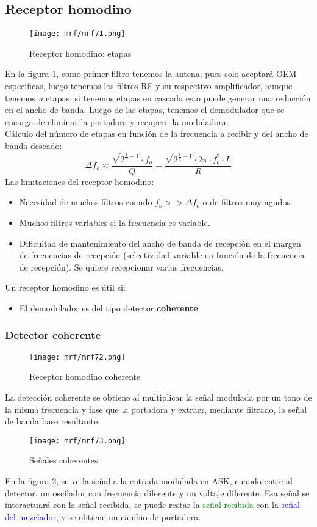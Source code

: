 \documentclass[
	12pt, %
	fleqn, %
	a4paper, %
	oneside, %
]{LegrandOrangeBook}
\begin{document}
\subsection{Receptor homodino}
\begin{figure}[H]
\centering
\texttt{[image: mrf/mrf71.png]}
\caption{Receptor homodino: etapas}
\label{fig:recep homo}
\end{figure}
En la figura \ref{fig:recep homo}, como primer filtro tenemos la antena, pues solo aceptará OEM especificas, luego tenemos los filtros RF y su respectivo amplificador, aunque tenemos \textit{n} etapas, si tenemos etapas en cascada esto puede generar una reducción en el ancho de banda. Luego de las etapas, tenemos el demodulador que se encarga de eliminar la portadora y recupera la moduladora.\\
Cálculo del número de etapas en función de la frecuencia a recibir y del ancho de banda deseado:
\begin{equation}
\Delta f_o\approx \frac{\sqrt{2^{\frac{1}{n}-1}}\cdot f_o}{Q}=\frac{\sqrt{2^{\frac{1}{n}-1}}\cdot 2\pi\cdot f_o^2\cdot L}{R}
\end{equation}
Las limitaciones del receptor homodino:
\begin{itemize}
\item Necesidad de muchos filtros cuando $f_o>>\Delta f_o$ o de filtros muy agudos.
\item Muchos filtros variables si la frecuencia es variable.
\item Dificultad de mantenimiento del ancho de banda de recepción en el margen de frecuencias de recepción (selectividad variable en función de la frecuencia de recepción). Se quiere recepcionar varias frecuencias.
\end{itemize}
Un receptor homodino es útil si:
\begin{itemize}
\item El demodulador es del tipo detector \textbf{coherente}
\end{itemize}
\subsubsection*{Detector coherente}
\begin{figure}[H]
\centering
\texttt{[image: mrf/mrf72.png]}
\caption{Receptor homodino coherente}
\end{figure}
\begin{definition}
La detección coherente se obtiene al multiplicar la señal modulada por un tono de la
misma frecuencia y fase que la portadora y extraer, mediante filtrado, la señal de banda
base resultante.
\end{definition}
\begin{figure}[H]
\centering
\texttt{[image: mrf/mrf73.png]}
\caption{Señales coherentes.}
\label{fig:señal coherente}
\end{figure}
En la figura \ref{fig:señal coherente}, se ve la señal a la entrada modulada en ASK, cuando entre al detector, un oscilador con frecuencia diferente y un voltaje diferente. Esa señal se interactuará con la señal recibida, se puede restar la \textcolor{green}{señal recibida} con la \textcolor{blue}{señal del mezclador}, y se obtiene un cambio de portadora.
\end{document}
